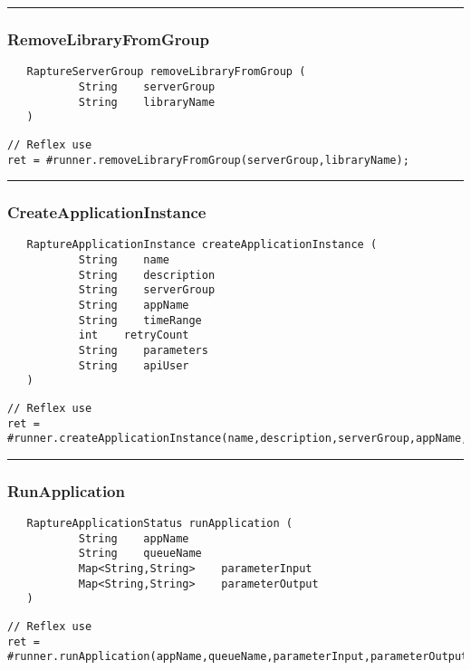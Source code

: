 \rule{15cm}{2pt}
\subsubsection{RemoveLibraryFromGroup}
\label{Api:RemoveLibraryFromGroup}
\begin{verbatim}
   RaptureServerGroup removeLibraryFromGroup (
           String    serverGroup
           String    libraryName
   )
\end{verbatim}
\begin{lstlisting}[language=reflex]
// Reflex use
ret = #runner.removeLibraryFromGroup(serverGroup,libraryName);
\end{lstlisting}



\rule{15cm}{2pt}
\subsubsection{CreateApplicationInstance}
\label{Api:CreateApplicationInstance}
\begin{verbatim}
   RaptureApplicationInstance createApplicationInstance (
           String    name
           String    description
           String    serverGroup
           String    appName
           String    timeRange
           int    retryCount
           String    parameters
           String    apiUser
   )
\end{verbatim}
\begin{lstlisting}[language=reflex]
// Reflex use
ret = #runner.createApplicationInstance(name,description,serverGroup,appName,timeRange,retryCount,parameters,apiUser);
\end{lstlisting}



\rule{15cm}{2pt}
\subsubsection{RunApplication}
\label{Api:RunApplication}
\begin{verbatim}
   RaptureApplicationStatus runApplication (
           String    appName
           String    queueName
           Map<String,String>    parameterInput
           Map<String,String>    parameterOutput
   )
\end{verbatim}
\begin{lstlisting}[language=reflex]
// Reflex use
ret = #runner.runApplication(appName,queueName,parameterInput,parameterOutput);
\end{lstlisting}



